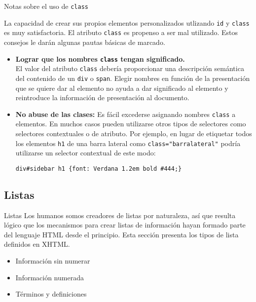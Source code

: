 \begin{frame}[fragile]{Notas sobre el uso de \texttt{class}} %
\footnotesize{
    La capacidad de crear sus propios elementos personalizados utlizando
    \texttt{id} y \texttt{class} es muy satisfactoria. El atributo
    \texttt{class} es propenso a ser mal utilizado. Estos consejos le darán
    algunas pautas básicas de marcado. 

    \begin{itemize}
        \item \textbf{Lograr que los nombres \texttt{class} tengan
        significado.} \\
        El valor del atributo \texttt{class} debería proporcionar una
        descripción semántica del contenido de un \texttt{div} o \texttt{span}.
        Elegir nombres en función de la presentación que se quiere dar al
        elemento no ayuda a dar significado al elemento y reintroduce la
        información de presentación al documento. 

        \item \textbf{No abuse de las clases: } Es fácil excederse asignando
        nombres \texttt{class} a elementos. En muchos casos pueden utilizarse
        otros tipos de selectores como selectores contextuales o de atributo.
        Por ejemplo, en lugar de etiquetar todos los elementos \texttt{h1} de
        una barra lateral como \texttt{class="barralateral"} podría utilizarse
        un selector contextual de este modo: 

        \begin{lstlisting}
div#sidebar h1 {font: Verdana 1.2em bold #444;}
        \end{lstlisting}
    \end{itemize}
    }
\end{frame}

\subsection{Listas} %

\begin{frame}{Listas} %
    Los humanos somos creadores de listas por naturaleza, así que resulta
    lógico que los mecanismos para crear listas de información hayan formado
    parte del lenguaje HTML desde el principio. Esta sección presenta los tipos
    de lista definidos en XHTML. 
    \begin{itemize}
        \item Información sin numerar
        \item Información numerada
        \item Términos y definiciones
    \end{itemize}
\end{frame}


